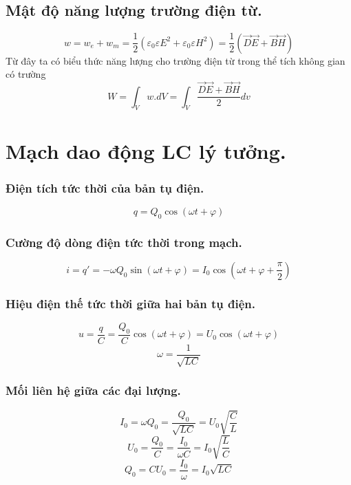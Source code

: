 \documentclass[12pt, a4paper]{report}
\begin{document}
\subsection{Mật độ năng lượng trường điện từ.}
\begin{equation}
    w = w_e + w_m = \frac{1}{2} \left( \varepsilon_0 \varepsilon E^2 + \varepsilon_0 \varepsilon H^2 \right) = \frac{1}{2} \left( \vec{D}\vec{E} + \vec{B}\vec{H} \right)
\end{equation}
Từ đây ta có biểu thức năng lượng cho trường điện từ trong thể tích không gian có trường
\begin{equation}
    W = \int_V w.dV=\int_V \frac{\vec{D}\vec{E} + \vec{B}\vec{H}}{2} dv
\end{equation}
\section{Mạch dao động LC lý tưởng.}
\subsubsection{Điện tích tức thời của bản tụ điện.}
\begin{equation}
    q = Q_0\cos(\omega t + \varphi)
\end{equation}
\subsubsection{Cường độ dòng điện tức thời trong mạch.}
\begin{equation}
    i = q' = -\omega Q_0 \sin(\omega t + \varphi) = I_0 \cos \left(\omega t + \varphi + \frac{\pi}{2}\right)
\end{equation}
\subsubsection{Hiệu điện thế tức thời giữa hai bản tụ điện.}
\begin{equation}
    u = \frac{q}{C} = \frac{Q_0}{C}\cos (\omega t + \varphi) = U_0 \cos(\omega t + \varphi)
\end{equation}
\[
    \omega = \frac{1}{\sqrt{LC}}    
\]
\subsubsection{Mối liên hệ giữa các đại lượng.}
\begin{equation}
    I_0 = \omega Q_0 = \frac{Q_0}{\sqrt{LC}} = U_0 \sqrt{\frac{C}{L}}
\end{equation}
\begin{equation}
    U_0 = \frac{Q_0}{C} = \frac{I_0}{\omega C} = I_0 \sqrt{\frac{L}{C}}
\end{equation}
\begin{equation}
    Q_0 = CU_0 = \frac{I_0}{\omega} = I_0 \sqrt{LC}
\end{equation}
\end{document}
